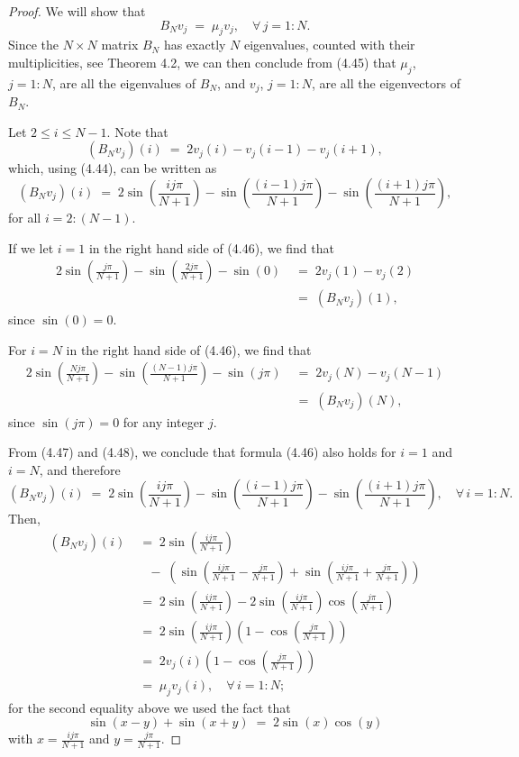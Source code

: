 \begin{proof}
We will show that
\begin{equation}
B_N v_j \;=\; \mu_j v_j, \quad \forall\, j = 1:N.
\end{equation}
Since the $N \times N$ matrix $B_N$ has exactly $N$ eigenvalues, counted with their
multiplicities, see Theorem 4.2, we can then conclude from (4.45) that $\mu_j$,
$j = 1:N$, are all the eigenvalues of $B_N$, and $v_j$, $j = 1:N$, are all the
eigenvectors of $B_N$.

Let $2 \leq i \leq N-1$. Note that
\[
(B_N v_j)(i) \;=\; 2v_j(i) - v_j(i-1) - v_j(i+1),
\]
which, using (4.44), can be written as
\begin{equation}
(B_N v_j)(i) \;=\; 2\sin\left(\frac{ij\pi}{N+1}\right) - \sin\left(\frac{(i-1)j\pi}{N+1}\right)
- \sin\left(\frac{(i+1)j\pi}{N+1}\right),
\end{equation}
for all $i = 2:(N-1)$.

If we let $i = 1$ in the right hand side of (4.46), we find that
\begin{equation}
\begin{split}
2\sin\left(\frac{j\pi}{N+1}\right) - \sin\left(\frac{2j\pi}{N+1}\right) - \sin(0)
&\;=\; 2v_j(1) - v_j(2)\\
&\;=\; (B_N v_j)(1),
\end{split}
\end{equation}
since $\sin(0) = 0$.

For $i = N$ in the right hand side of (4.46), we find that
\begin{equation}
\begin{split}
2\sin\left(\frac{Nj\pi}{N+1}\right) - \sin\left(\frac{(N-1)j\pi}{N+1}\right) - \sin(j\pi)
&\;=\; 2v_j(N) - v_j(N-1)\\
&\;=\; (B_N v_j)(N),
\end{split}
\end{equation}
since $\sin(j\pi) = 0$ for any integer $j$.

From (4.47) and (4.48), we conclude that formula (4.46) also holds for $i = 1$ and
$i = N$, and therefore
\[
(B_N v_j)(i) \;=\; 2\sin\left(\frac{ij\pi}{N+1}\right) - \sin\left(\frac{(i-1)j\pi}{N+1}\right)
- \sin\left(\frac{(i+1)j\pi}{N+1}\right), \quad \forall\, i = 1:N.
\]
Then,
\begin{align*}
(B_N v_j)(i) &\;=\; 2\sin\left(\frac{ij\pi}{N+1}\right)\\
&\quad -\; \left(\sin\left(\frac{ij\pi}{N+1} - \frac{j\pi}{N+1}\right)
+ \sin\left(\frac{ij\pi}{N+1} + \frac{j\pi}{N+1}\right)\right)\\
&\;=\; 2\sin\left(\frac{ij\pi}{N+1}\right) - 2\sin\left(\frac{ij\pi}{N+1}\right)\cos\left(\frac{j\pi}{N+1}\right)\\
&\;=\; 2\sin\left(\frac{ij\pi}{N+1}\right)\left(1 - \cos\left(\frac{j\pi}{N+1}\right)\right)\\
&\;=\; 2v_j(i)\left(1 - \cos\left(\frac{j\pi}{N+1}\right)\right)\\
&\;=\; \mu_j v_j(i), \quad \forall\, i = 1:N;
\end{align*}
for the second equality above we used the fact that
\[
\sin(x-y) + \sin(x+y) \;=\; 2\sin(x)\cos(y)
\]
with $x = \frac{ij\pi}{N+1}$ and $y = \frac{j\pi}{N+1}$.


\end{proof}
